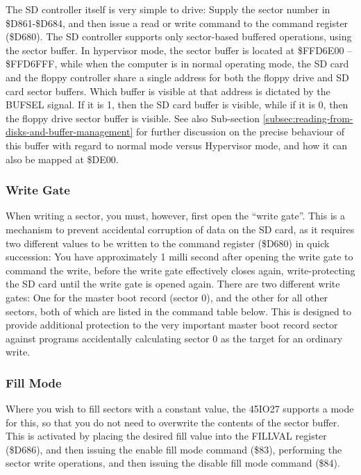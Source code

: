 \begin{enumerate}
The SD controller itself is very simple to drive: Supply the sector
number in \$D861-\$D684, and then issue a read or write command to the
command register (\$D680).  The SD controller supports only
sector-based buffered operations, using the sector buffer. In
hypervisor mode, the sector buffer is located at \$FFD6E00 --
\$FFD6FFF, while when the computer is in normal operating mode, the SD
card and the floppy controller share a single address for both the
floppy drive and SD card sector buffers. Which buffer is visible at
that address is dictated by the BUFSEL signal. If it is 1, then the SD
card buffer is visible, while if it is 0, then the floppy drive sector
buffer is visible.  See also Sub-section
\vref{subsec:reading-from-disks-and-buffer-management} for further
discussion on the precise behaviour of this buffer with regard to
normal mode versus Hypervisor mode, and how it can also be mapped at
\$DE00. 

\subsubsection{Write Gate}

When writing a sector, you must, however, first open the ``write
gate''. This is a mechanism to prevent accidental corruption of data
on the SD card, as it requires two different values to be written to
the command register (\$D680) in quick succession: You have
approximately 1 milli second after opening the write gate to command
the write, before the write gate effectively closes again,
write-protecting the SD card until the write gate is opened again.
There are two different write gates: One for the master boot record
(sector 0), and the other for all other sectors, both of which are
listed in the command table below. This is designed to provide
additional protection to the very important master boot record sector
against programs accidentally calculating sector 0 as the target for
an ordinary write.

\subsubsection{Fill Mode}

Where you wish to fill sectors with a constant value, the 45IO27
supports a mode for this, so that you do not need to overwrite the
contents of the sector buffer. This is activated by placing the
desired fill value into the FILLVAL register (\$D686), and then
issuing the enable fill mode command (\$83), performing the sector
write operations, and then issuing the disable fill mode command
(\$84). 


\end{enumerate}
